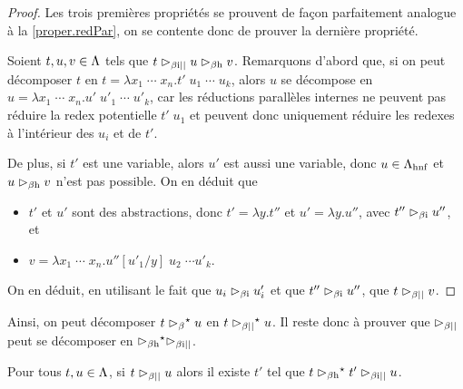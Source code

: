 \begin{proof}
  Les trois premières propriétés se prouvent de façon parfaitement analogue à la
  \cref{proper.redPar}, on se contente donc de prouver la dernière propriété.

  Soient $t,u,v \in \Lambda$ tels que $t \mathrel{\rhd_{\beta\mathrm{i}{\mathord{||}}}} u \mathrel{\rhd_{\beta\mathrm{h}}} v$. Remarquons d'abord
  que, si on peut décomposer $t$ en
  $t = \lambda x_1\;\cdots\;x_n.t'\;u_1\;\cdots\;u_k$, alors
  $u$ se décompose en
  $u = \lambda x_1\;\cdots\;x_n.u'\;u'_1\;\cdots\;u'_k$, car les réductions
  parallèles internes ne peuvent pas réduire la redex potentielle $t'\;u_1$ et
  peuvent donc uniquement réduire les redexes à l'intérieur des $u_i$ et de
  $t'$.

  De plus, si $t'$ est une variable, alors $u'$ est aussi une variable, donc
  $u\in\Lambda_{\mathrm{hnf}}$ et $u \mathrel{\rhd_{\beta\mathrm{h}}} v$ n'est pas possible. On en déduit que
  \begin{itemize}
  \item $t'$ et $u'$ sont des abstractions, donc $t' = \lambda y.t''$ et
    $u' = \lambda y.u''$, avec $t'' \mathrel{\rhd_{\beta\mathrm{i}}} u''$, et
  \item $v = \lambda x_1\;\cdots\;x_n.u''[u'_1/y]\;u_2\;\cdots u'_k$.
  \end{itemize}

  On en déduit, en utilisant le fait que $u_i \mathrel{\rhd_{\beta\mathrm{i}}} u'_i$ et que
  $t''\mathrel{\rhd_{\beta\mathrm{i}}} u''$, que $t \mathrel{\rhd_{\mathord{\beta}\mathord{||}}} v$.
\end{proof}

Ainsi, on peut décomposer $t \mathrel{\rhd_{\beta}}^{\mathord{\star}} u$ en $t\mathrel{\rhd_{\mathord{\beta}\mathord{||}}}^{\mathord{\star}} u$. Il
reste donc à prouver que $\mathrel{\rhd_{\mathord{\beta}\mathord{||}}}$ peut se décomposer en
$\mathrel{\rhd_{\beta\mathrm{h}}}^{\mathord{\star}}\mathrel{\rhd_{\beta\mathrm{i}{\mathord{||}}}}$.

\begin{lemma}
  Pour tous $t,u \in \Lambda$, si $t \mathrel{\rhd_{\mathord{\beta}\mathord{||}}} u$ alors il existe
  $t'$ tel que $t \mathrel{\rhd_{\beta\mathrm{h}}}^{\mathord{\star}} t' \mathrel{\rhd_{\beta\mathrm{i}{\mathord{||}}}} u$.
\end{lemma}

